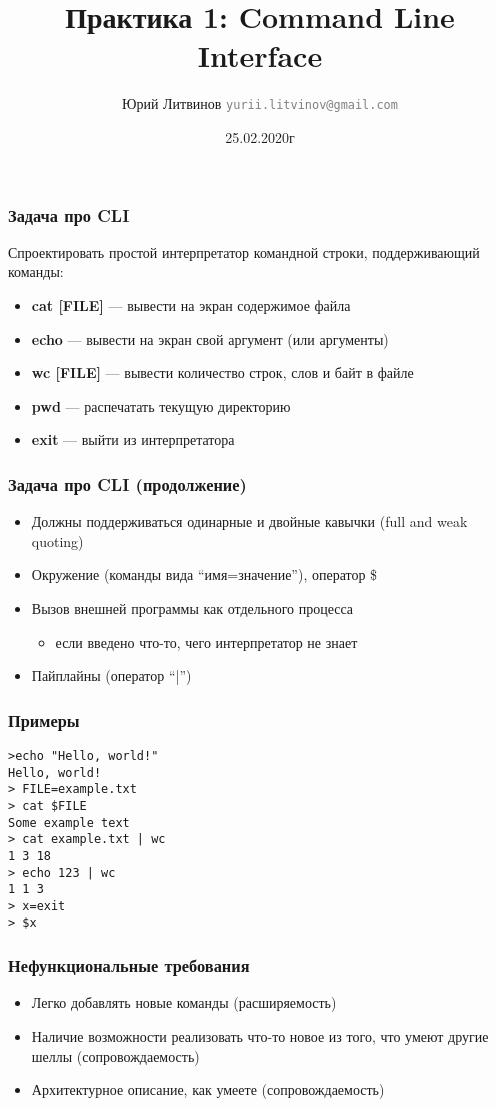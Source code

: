 \documentclass[xetex,mathserif,serif]{beamer}
\title{Практика 1: Command Line Interface}
\author[Юрий Литвинов]{Юрий Литвинов \newline \textcolor{gray}{\small\texttt{yurii.litvinov@gmail.com}}}
\date{25.02.2020г}
\begin{document}
	\frame{\titlepage}

	\begin{frame}
		\frametitle{Задача про CLI}
		Спроектировать простой интерпретатор командной строки, поддерживающий команды:
		\begin{itemize}
			\item \textbf{cat [FILE]} --- вывести на экран содержимое файла
			\item \textbf{echo} --- вывести на экран свой аргумент (или аргументы)
			\item \textbf{wc [FILE]} --- вывести количество строк, слов и байт в файле
			\item \textbf{pwd} --- распечатать текущую директорию
			\item \textbf{exit} --- выйти из интерпретатора
		\end{itemize}
	\end{frame}
	
	\begin{frame}
		\frametitle{Задача про CLI (продолжение)}
		\begin{itemize}
			\item Должны поддерживаться одинарные и двойные кавычки (full and weak quoting)
			\item Окружение (команды вида ``имя=значение''), оператор \$
			\item Вызов внешней программы как отдельного процесса
			\begin{itemize}
				\item если введено что-то, чего интерпретатор не знает
			\end{itemize}
			\item Пайплайны (оператор ``|'')
		\end{itemize}
	\end{frame}
	
	\begin{frame}[fragile]
		\frametitle{Примеры}
\begin{verbatim}
>echo "Hello, world!"
Hello, world!
> FILE=example.txt
> cat $FILE
Some example text
> cat example.txt | wc
1 3 18
> echo 123 | wc
1 1 3
> x=exit
> $x
		\end{verbatim}
	\end{frame}

	\begin{frame}
		\frametitle{Нефункциональные требования}
		\begin{itemize}
			\item Легко добавлять новые команды (расширяемость)
			\item Наличие возможности реализовать что-то новое из того, что умеют другие шеллы (сопровождаемость)
			\item Архитектурное описание, как умеете (сопровождаемость)
		\end{itemize}
	\end{frame}
	
\end{document}
